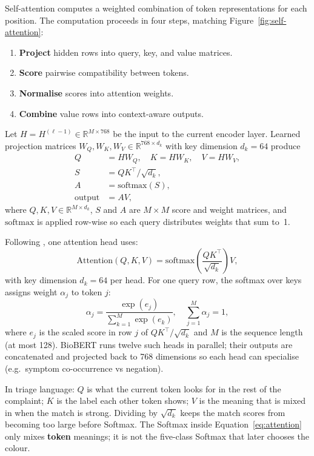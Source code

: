Self-attention computes a weighted combination of token representations for each position. The computation proceeds in four steps, matching Figure~\ref{fig:self-attention}:

\begin{enumerate}
\item \textbf{Project} hidden rows into query, key, and value matrices.
\item \textbf{Score} pairwise compatibility between tokens.
\item \textbf{Normalise} scores into attention weights.
\item \textbf{Combine} value rows into context-aware outputs.
\end{enumerate}
Let \(H = H^{(\ell-1)} \in \mathbb{R}^{M \times 768}\) be the input to the current encoder layer. Learned projection matrices \(W_Q, W_K, W_V \in \mathbb{R}^{768 \times d_k}\) with key dimension \(d_k = 64\) produce
\begin{align*}
  Q &= H W_Q, \quad K = H W_K, \quad V = H W_V, \\
  S &= QK^\top / \sqrt{d_k}, \\
  A &= \mathrm{softmax}(S), \\
  \text{output} &= AV,
\end{align*}
where \(Q,K,V \in \mathbb{R}^{M \times d_k}\), \(S\) and \(A\) are \(M \times M\) score and weight matrices, and \(\mathrm{softmax}\) is applied row-wise so each query distributes weights that sum to~1.

Following \citet{vaswani2017attention}, one attention head uses:
\begin{equation}
  \mathrm{Attention}(Q,K,V) = \mathrm{softmax}\!\left(\frac{QK^{\top}}{\sqrt{d_k}}\right)V,
  \label{eq:attention}
\end{equation}
with key dimension \(d_k = 64\) per head. For one query row, the softmax over keys assigns weight \(\alpha_j\) to token \(j\):
\begin{equation}
  \alpha_j = \frac{\exp(e_j)}{\sum_{k=1}^{M}\exp(e_k)}, \quad \sum_{j=1}^{M}\alpha_j = 1,
  \label{eq:attn-softmax}
\end{equation}
where \(e_j\) is the scaled score in row \(j\) of \(QK^\top/\sqrt{d_k}\) and \(M\) is the sequence length (at most 128). BioBERT runs twelve such heads in parallel; their outputs are concatenated and projected back to 768 dimensions so each head can specialise (e.g.\ symptom co-occurrence vs negation).

\begin{remark}
In triage language: \(Q\) is what the current token looks for in the rest of the complaint; \(K\) is the label each other token shows; \(V\) is the meaning that is mixed in when the match is strong. Dividing by \(\sqrt{d_k}\) keeps the match scores from becoming too large before Softmax. The Softmax inside Equation~\eqref{eq:attention} only mixes \textbf{token} meanings; it is not the five-class Softmax that later chooses the colour.
\end{remark}

